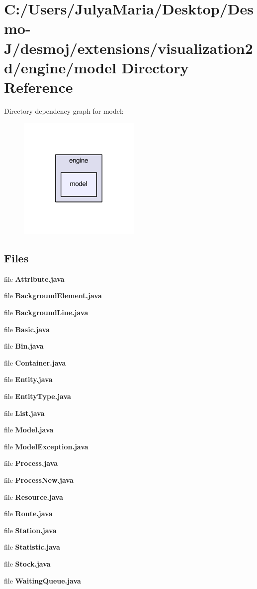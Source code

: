 \section{C\-:/\-Users/\-Julya\-Maria/\-Desktop/\-Desmo-\/\-J/desmoj/extensions/visualization2d/engine/model Directory Reference}
\label{dir_7a556f7795431fe1b4c2d146c4fc2a0c}
Directory dependency graph for model\-:
\nopagebreak
\begin{figure}[H]
\begin{center}
\leavevmode
\includegraphics[width=166pt]{dir_7a556f7795431fe1b4c2d146c4fc2a0c_dep}
\end{center}
\end{figure}
\subsection*{Files}
\begin{DoxyCompactItemize}
\item 
file {\bfseries Attribute.\-java}
\item 
file {\bfseries Background\-Element.\-java}
\item 
file {\bfseries Background\-Line.\-java}
\item 
file {\bfseries Basic.\-java}
\item 
file {\bfseries Bin.\-java}
\item 
file {\bfseries Container.\-java}
\item 
file {\bfseries Entity.\-java}
\item 
file {\bfseries Entity\-Type.\-java}
\item 
file {\bfseries List.\-java}
\item 
file {\bfseries Model.\-java}
\item 
file {\bfseries Model\-Exception.\-java}
\item 
file {\bfseries Process.\-java}
\item 
file {\bfseries Process\-New.\-java}
\item 
file {\bfseries Resource.\-java}
\item 
file {\bfseries Route.\-java}
\item 
file {\bfseries Station.\-java}
\item 
file {\bfseries Statistic.\-java}
\item 
file {\bfseries Stock.\-java}
\item 
file {\bfseries Waiting\-Queue.\-java}
\end{DoxyCompactItemize}
